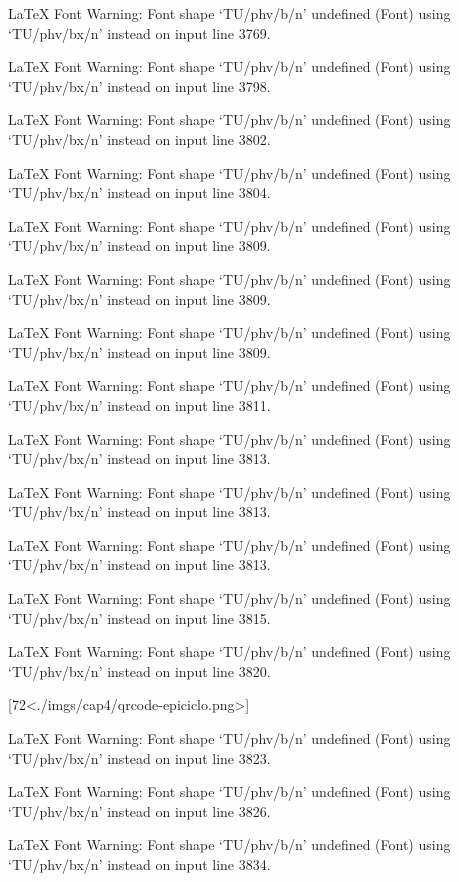 LaTeX Font Warning: Font shape `TU/phv/b/n' undefined
(Font)              using `TU/phv/bx/n' instead on input line 3769.


LaTeX Font Warning: Font shape `TU/phv/b/n' undefined
(Font)              using `TU/phv/bx/n' instead on input line 3798.


LaTeX Font Warning: Font shape `TU/phv/b/n' undefined
(Font)              using `TU/phv/bx/n' instead on input line 3802.


LaTeX Font Warning: Font shape `TU/phv/b/n' undefined
(Font)              using `TU/phv/bx/n' instead on input line 3804.


LaTeX Font Warning: Font shape `TU/phv/b/n' undefined
(Font)              using `TU/phv/bx/n' instead on input line 3809.


LaTeX Font Warning: Font shape `TU/phv/b/n' undefined
(Font)              using `TU/phv/bx/n' instead on input line 3809.


LaTeX Font Warning: Font shape `TU/phv/b/n' undefined
(Font)              using `TU/phv/bx/n' instead on input line 3809.


LaTeX Font Warning: Font shape `TU/phv/b/n' undefined
(Font)              using `TU/phv/bx/n' instead on input line 3811.


LaTeX Font Warning: Font shape `TU/phv/b/n' undefined
(Font)              using `TU/phv/bx/n' instead on input line 3813.


LaTeX Font Warning: Font shape `TU/phv/b/n' undefined
(Font)              using `TU/phv/bx/n' instead on input line 3813.


LaTeX Font Warning: Font shape `TU/phv/b/n' undefined
(Font)              using `TU/phv/bx/n' instead on input line 3813.


LaTeX Font Warning: Font shape `TU/phv/b/n' undefined
(Font)              using `TU/phv/bx/n' instead on input line 3815.


LaTeX Font Warning: Font shape `TU/phv/b/n' undefined
(Font)              using `TU/phv/bx/n' instead on input line 3820.

[72<./imgs/cap4/qrcode-epiciclo.png>]

LaTeX Font Warning: Font shape `TU/phv/b/n' undefined
(Font)              using `TU/phv/bx/n' instead on input line 3823.


LaTeX Font Warning: Font shape `TU/phv/b/n' undefined
(Font)              using `TU/phv/bx/n' instead on input line 3826.


LaTeX Font Warning: Font shape `TU/phv/b/n' undefined
(Font)              using `TU/phv/bx/n' instead on input line 3834.


